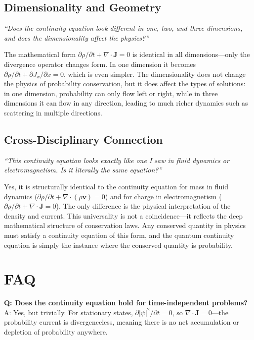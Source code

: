 \documentclass[11pt,openright]{book}
\begin{document}
\subsection*{Dimensionality and Geometry}
\textit{``Does the continuity equation look different in one, two, and three dimensions, and does the dimensionality affect the physics?''}

The mathematical form $\partial\rho/\partial t + \nabla \cdot \mathbf{J} = 0$ is identical in all dimensions---only the divergence operator changes form. In one dimension it becomes $\partial\rho/\partial t + \partial J_x/\partial x = 0$, which is even simpler. The dimensionality does not change the physics of probability conservation, but it does affect the types of solutions: in one dimension, probability can only flow left or right, while in three dimensions it can flow in any direction, leading to much richer dynamics such as scattering in multiple directions.

\subsection*{Cross-Disciplinary Connection}
\textit{``This continuity equation looks exactly like one I saw in fluid dynamics or electromagnetism. Is it literally the same equation?''}

Yes, it is structurally identical to the continuity equation for mass in fluid dynamics ($\partial\rho/\partial t + \nabla \cdot (\rho\mathbf{v}) = 0$) and for charge in electromagnetism ($\partial\rho/\partial t + \nabla \cdot \mathbf{J} = 0$). The only difference is the physical interpretation of the density and current. This universality is not a coincidence---it reflects the deep mathematical structure of conservation laws. Any conserved quantity in physics must satisfy a continuity equation of this form, and the quantum continuity equation is simply the instance where the conserved quantity is probability.

\section*{FAQ}

\textbf{Q: Does the continuity equation hold for time-independent problems?}
A: Yes, but trivially. For stationary states, $\partial|\psi|^2/\partial t = 0$, so $\nabla \cdot \mathbf{J} = 0$---the probability current is divergenceless, meaning there is no net accumulation or depletion of probability anywhere.
\end{document}
